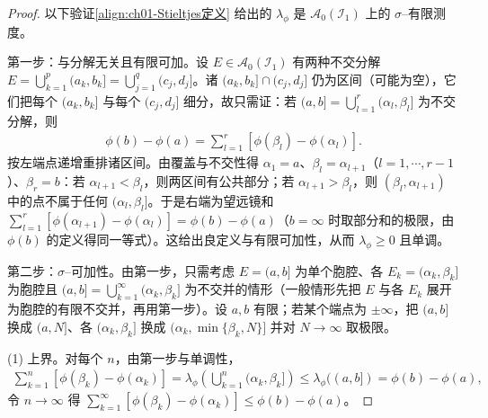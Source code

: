 \documentclass[../../main.tex]{subfiles}%
\begin{document}
\begin{proof}
以下验证\eqref{align:ch01-Stieltjes定义} 给出的 $\lambda_\phi$ 是 $\mathcal{A}_0(\mathcal{I}_1)$ 上的 $\sigma$--有限测度。

第一步：与分解无关且有限可加。设 $E\in\mathcal{A}_0(\mathcal{I}_1)$ 有两种不交分解 $E=\bigcup_{k=1}^p(a_k,b_k]=\bigcup_{j=1}^q(c_j,d_j]$。诸 $(a_k,b_k]\cap(c_j,d_j]$ 仍为区间（可能为空），它们把每个 $(a_k,b_k]$ 与每个 $(c_j,d_j]$ 细分，故只需证：若 $(a,b]=\bigcup_{l=1}^r(\alpha_l,\beta_l]$ 为不交分解，则
\begin{align*}
\phi(b)-\phi(a)=\sum_{l=1}^r[\phi(\beta_l)-\phi(\alpha_l)].
\end{align*}
按左端点递增重排诸区间。由覆盖与不交性得 $\alpha_1=a$、$\beta_l=\alpha_{l+1}$（$l=1,\cdots ,r-1$）、$\beta_r=b$：若 $\alpha_{l+1}<\beta_l$，则两区间有公共部分；若 $\alpha_{l+1}>\beta_l$，则 $(\beta_l,\alpha_{l+1})$ 中的点不属于任何 $(\alpha_l,\beta_l]$。于是右端为望远镜和 $\sum_{l=1}^r[\phi(\alpha_{l+1})-\phi(\alpha_l)]=\phi(b)-\phi(a)$（$b=\infty$ 时取部分和的极限，由 $\phi(b)$ 的定义得同一等式）。这给出良定义与有限可加性，从而 $\lambda_\phi\geqslant0$ 且单调。

第二步：$\sigma$--可加性。由第一步，只需考虑 $E=(a,b]$ 为单个胞腔、各 $E_k=(\alpha_k,\beta_k]$ 为胞腔且 $(a,b]=\bigcup_{k=1}^\infty(\alpha_k,\beta_k]$ 为不交并的情形（一般情形先把 $E$ 与各 $E_k$ 展开为胞腔的有限不交并，再用第一步）。设 $a,b$ 有限；若某个端点为 $\pm\infty$，把 $(a,b]$ 换成 $(a,N]$、各 $(\alpha_k,\beta_k]$ 换成 $(\alpha_k,\min\{\beta_k,N\}]$ 并对 $N\to\infty$ 取极限。

(1) 上界。对每个 $n$，由第一步与单调性，
\begin{align*}
\sum_{k=1}^n[\phi(\beta_k)-\phi(\alpha_k)]=\lambda_\phi\left(\bigcup_{k=1}^n(\alpha_k,\beta_k]\right)\leqslant\lambda_\phi((a,b])=\phi(b)-\phi(a),
\end{align*}
令 $n\to\infty$ 得 $\sum_{k=1}^\infty[\phi(\beta_k)-\phi(\alpha_k)]\leqslant\phi(b)-\phi(a)$。


\end{proof}
\end{document}
